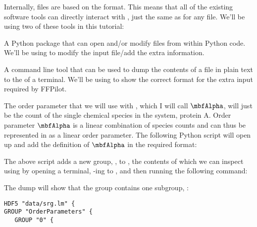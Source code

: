 {Internally,  files are based on the  format. This means that all of the existing  software tools can directly interact with \pth{\lm}, just the same as for any  file. We'll be using two of these  tools in this tutorial:
\begin{description}[style=nextline]
    \item[\py{h5py}] A Python package that can open and/or modify  files from within Python code. We'll be using  to modify the input file/add the extra information.
    \item[\exe{h5dump}] A command line tool that can be used to dump the contents of a  file in plain text to the  of a terminal. We'll be using  to show the correct format for the extra input required by FFPilot.
\end{description}

The order parameter that we will use with , which I will call $\oparama$, will just be the count of the single chemical species in the system, protein A. Order parameter $\oparama$ is a linear combination of species counts and can thus be represented in  as a linear order parameter. The following Python script will open up \pth{\lm} and add the definition of $\oparama$ in the required format:


The above script adds a new group, , to \pth{\lm}, the contents of which we can inspect using  by opening a terminal, -ing to \pth{\dir}, and then running the following command:


The dump will show that the  group contains one subgroup, :

\begin{verbatim}
HDF5 "data/srg.lm" {
GROUP "OrderParameters" {
   GROUP "0" {
\end{verbatim}

}
